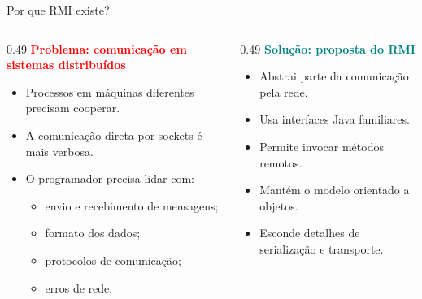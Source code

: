 \documentclass[aspectratio=169]{beamer}
\begin{document}
\begin{frame}[t]{Por que RMI existe?}

    \begin{columns}[T,onlytextwidth]
        \begin{column}{0.49\textwidth}
            \textbf{\textcolor{red}{Problema: comunicação em sistemas distribuídos}}

            \begin{itemize}\setlength\itemsep{1pt}
                \item Processos em máquinas diferentes precisam cooperar.
                \item A comunicação direta por sockets é mais verbosa.
                \item O programador precisa lidar com:
                \begin{itemize}\setlength\itemsep{0pt}
                    \item[$\circ$] envio e recebimento de mensagens;
                    \item[$\circ$] formato dos dados;
                    \item[$\circ$] protocolos de comunicação;
                    \item[$\circ$] erros de rede.
                \end{itemize}
            \end{itemize}
        \end{column}

        \begin{column}{0.49\textwidth}
            \textbf{\textcolor{teal}{Solução: proposta do RMI}}

            \begin{itemize}\setlength\itemsep{1pt}
                \item[$\checkmark$] Abstrai parte da comunicação pela rede.
                \item[$\checkmark$] Usa interfaces Java familiares.
                \item[$\checkmark$] Permite invocar métodos remotos.
                \item[$\checkmark$] Mantém o modelo orientado a objetos.
                \item[$\checkmark$] Esconde detalhes de serialização e transporte.
            \end{itemize}
        \end{column}
    \end{columns}


\end{frame}
\end{document}
